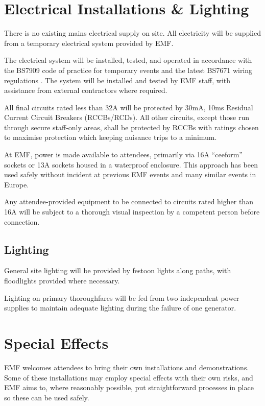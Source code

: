\section{Electrical Installations \& Lighting}\label{power}

There is no existing mains electrical supply on site. All electricity will be
supplied from a temporary electrical system provided by EMF.

The electrical system will be installed, tested, and operated in accordance with
the BS7909 code of practice for temporary events \cite{bs7909} and the latest
BS7671 wiring regulations \cite{bs7671}.  The system will be
installed and tested by EMF staff, with assistance from external contractors
where required.

All final circuits rated less than 32A will be protected by 30mA, 10ms Residual
Current Circuit Breakers (RCCBs/RCDs).  All other circuits, except those run
through secure staff-only areas, shall be protected by RCCBs with ratings chosen
to maximise protection which keeping nuisance trips to a minimum.

At EMF, power is made available to attendees, primarily via 16A ``ceeform''
sockets or 13A sockets housed in a waterproof enclosure. This approach has been
used safely without incident at previous EMF events and many similar events in Europe.

Any attendee-provided equipment to be connected to circuits rated higher than 16A
will be subject to a thorough visual inspection by a competent person before connection.

\subsection{Lighting}
General site lighting will be provided by festoon lights along paths,
with floodlights provided where necessary.

Lighting on primary thoroughfares will be fed from two independent power supplies
to maintain adequate lighting during the failure of one generator.

\newpage

\section{Special Effects}
EMF welcomes attendees to bring their own installations and demonstrations.
Some of these installations may employ special effects with their own risks,
and EMF aims to, where reasonably possible, put straightforward processes in
place so these can be used safely.

